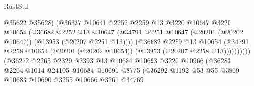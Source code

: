 \begin{lexlean}{RustStd}
\begin{coremodule}
                                          @35622
                                          @35628)
                                        (@36337
                                          @10641
                                          @2252
                                          @2259
                                          @13
                                          @3220
                                          @10647
                                          @3220
                                          @10654
                                          (@36682
                                            @2252
                                            @13
                                            @10647
                                            (@34791
                                              @2251
                                              @10647
                                              (@20201 (@20202 @10647))
                                              (@13953 (@20207 @2251 @13))))
                                          (@36682
                                            @2259
                                            @13
                                            @10654
                                            (@34791
                                              @2258
                                              @10654
                                              (@20201 (@20202 @10654))
                                              (@13953 (@20207 @2258 @13))))))))))
                              (@36272
                                @2265
                                @2329
                                @2393
                                @13
                                @10684
                                @10693
                                @3220
                                @10966
                                (@36283
                                  @2264
                                  @1014
                                  @24105
                                  @10684
                                  @10691
                                  @8775
                                  (@36292
                                    @1192
                                    @53
                                    @55
                                    @3869
                                    @10683
                                    @10690
                                    @3255
                                    @10666
                                    @3261
                                    @34769

\end{coremodule}
\end{lexlean}
